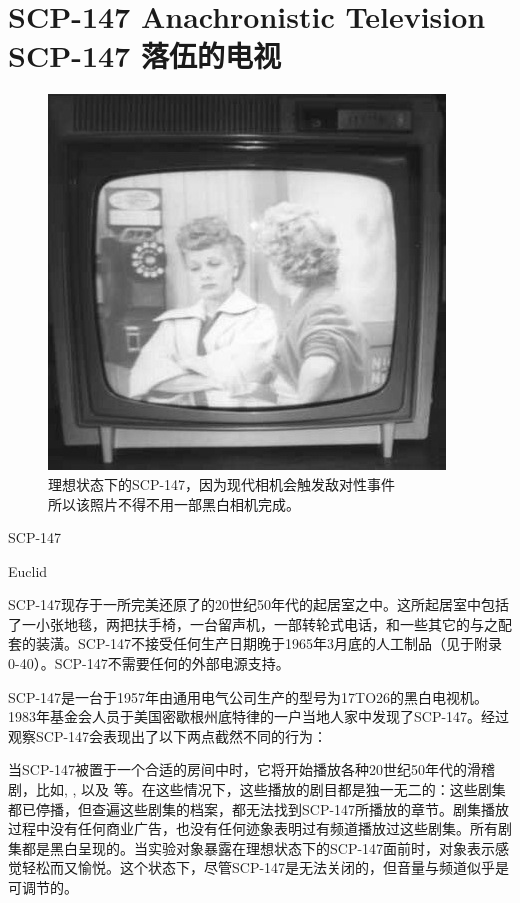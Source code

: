 \chapter[SCP-147 落伍的电视]{
    SCP-147 Anachronistic Television\\
    SCP-147 落伍的电视
}

\label{chap:SCP-147}

\begin{figure}[H]
    \centering
    \includegraphics[width=0.5\linewidth]{images/SCP-147.jpg}
    \caption*{理想状态下的SCP-147，因为现代相机会触发敌对性事件\\所以该照片不得不用一部黑白相机完成。}
\end{figure}

SCP-147

Euclid

SCP-147现存于一所完美还原了的20世纪50年代的起居室之中。这所起居室中包括了一小张地毯，两把扶手椅，一台留声机，一部转轮式电话，和一些其它的与之配套的装潢。SCP-147不接受任何生产日期晚于1965年3月底的人工制品（见于附录 0-40）。SCP-147不需要任何的外部电源支持。

SCP-147是一台于1957年由通用电气公司生产的型号为17TO26的黑白电视机。1983年基金会人员于美国密歇根州底特律的一户当地人家中发现了SCP-147。经过观察SCP-147会表现出了以下两点截然不同的行为：

当SCP-147被置于一个合适的房间中时，它将开始播放各种20世纪50年代的滑稽剧，比如, , 以及 等。在这些情况下，这些播放的剧目都是独一无二的：这些剧集都已停播，但查遍这些剧集的档案，都无法找到SCP-147所播放的章节。剧集播放过程中没有任何商业广告，也没有任何迹象表明过有频道播放过这些剧集。所有剧集都是黑白呈现的。当实验对象暴露在理想状态下的SCP-147面前时，对象表示感觉轻松而又愉悦。这个状态下，尽管SCP-147是无法关闭的，但音量与频道似乎是可调节的。

